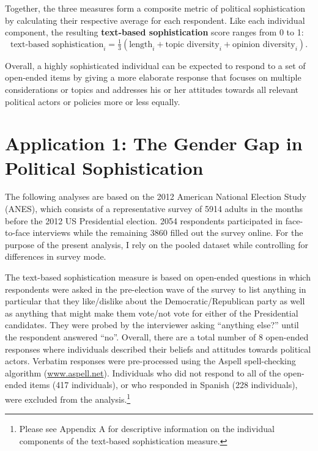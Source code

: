 \documentclass[12pt]{article}
\begin{document}
Together, the three measures form a composite metric of political sophistication by calculating their respective average for each respondent. Like each individual component, the resulting \textbf{text-based sophistication} score ranges from 0 to 1:
\begin{equation}
\text{text-based sophistication}_i = \tfrac{1}{3}(\text{length}_i + \text{topic diversity}_i + \text{opinion diversity}_i).
\end{equation}

Overall, a highly sophisticated individual can be expected to respond to a set of open-ended items by giving a more elaborate response that focuses on multiple considerations or topics and addresses his or her attitudes towards all relevant political actors or policies more or less equally.




\section*{Application 1: The Gender Gap in Political Sophistication}

The following analyses are based on the 2012 American National Election Study (ANES), which consists of a representative survey of 5914 adults in the months before the 2012 US Presidential election. 2054 respondents participated in face-to-face interviews while the remaining 3860 filled out the survey online. For the purpose of the present analysis, I rely on the pooled dataset while controlling for differences in survey mode. 

The text-based sophistication measure is based on open-ended questions in which respondents were asked in the pre-election wave of the survey to list anything in particular that they like/dislike about the Democratic/Republican party as well as anything that might make them vote/not vote for either of the Presidential candidates. They were probed by the interviewer asking ``anything else?'' until the respondent answered ``no''. Overall, there are a total number of 8 open-ended responses where individuals described their beliefs and attitudes towards political actors. Verbatim responses were pre-processed using the Aspell spell-checking algorithm (\url{www.aspell.net}). Individuals who did not respond to all of the open-ended items (417 individuals), or who responded in Spanish (228 individuals), were excluded from the analysis.\footnote{Please see Appendix A for descriptive information on the individual components of the text-based sophistication measure.}
\end{document}
